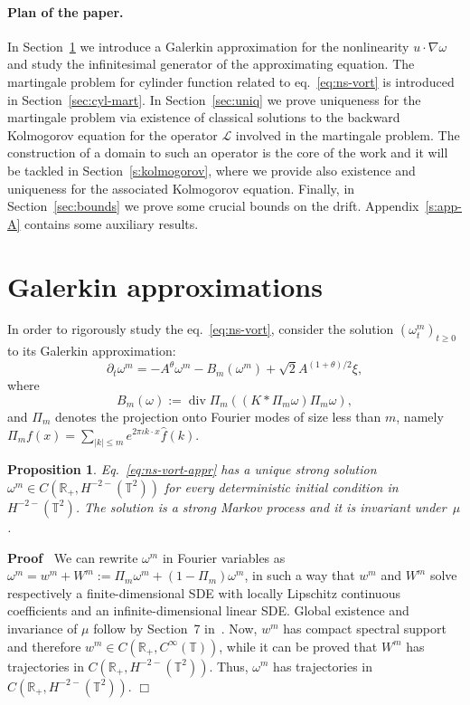 \documentclass{article}
\newcommand{\assign}{:=}
\newcommand{\tmop}[1]{\ensuremath{\operatorname{#1}}}
\newenvironment{proof}{\noindent\textbf{Proof\ }}{\hspace*{\fill}$\Box$\medskip}
\newtheorem{proposition}{Proposition}
{\theorembodyfont{\rmfamily}\newtheorem{remark}{Remark}}
\begin{document}
\paragraph*{Plan of the paper.}In Section~\ref{s:galerkin} we introduce a
Galerkin approximation for the nonlinearity $u \cdot \nabla \omega$ and study
the infinitesimal generator of the approximating equation. The martingale
problem for cylinder function related to eq.~{\eqref{eq:ns-vort}} is
introduced in Section~\ref{sec:cyl-mart}. In Section~\ref{sec:uniq} we prove
uniqueness for the martingale problem via existence of classical solutions to
the backward Kolmogorov equation for the operator $\mathcal{L}$ involved in
the martingale problem. The construction of a domain to such an operator is
the core of the work and it will be tackled in Section~\ref{s:kolmogorov},
where we provide also existence and uniqueness for the associated Kolmogorov
equation. Finally, in Section~\ref{sec:bounds} we prove some crucial bounds on
the drift. Appendix~\ref{s:app-A} contains some auxiliary results.

\section{Galerkin approximations}\label{s:galerkin}

In order to rigorously study the eq.~{\eqref{eq:ns-vort}}, consider the
solution $(\omega^m_t)_{t \geqslant 0}$ to its Galerkin approximation:
\begin{equation}
  \partial_t \omega^m = - A^{\theta} \omega^m - B_m (\omega^m) + \sqrt{2}
  A^{(1 + \theta) / 2} \xi, \label{eq:ns-vort-appr}
\end{equation}
where
\[ B_m (\omega) \assign \tmop{div} \Pi_m ((K \ast \Pi_m \omega) \Pi_m \omega),
\]
and $\Pi_m$ denotes the projection onto Fourier modes of size less than $m$,
namely $\Pi_m f (x) = \sum_{| k | \leqslant m} e^{2 \pi \iota k \cdot x}
\hat{f} (k)$.

\begin{proposition}
  Eq.~{\eqref{eq:ns-vort-appr}} has a unique strong solution $\omega^m \in C
  (\mathbb{R}_+, H^{- 2 -} (\mathbb{T}^2))$ for every deterministic initial
  condition in $H^{- 2 -} (\mathbb{T}^2)$. The solution is a strong Markov
  process and it is invariant under~$\mu$.
\end{proposition}

\begin{proof}
  We can rewrite $\omega^m$ in Fourier variables as $\omega^m = w^m + W^m
  \assign \Pi_m \omega^m + (1 - \Pi_m) \omega^m$, in such a way that $w^m$ and
  $W^m$ solve respectively a finite-dimensional SDE with locally Lipschitz
  continuous coefficients and an infinite-dimensional linear SDE. Global
  existence and invariance of $\mu$ follow by Section~7
  in~{\cite{gubinelli2013regularization}}. Now, $w^m$ has compact spectral
  support and therefore $w^m \in C (\mathbb{R}_+, C^{\infty} (\mathbb{T}))$,
  while it can be proved that $W^m$ has trajectories in $C (\mathbb{R}_+, H^{-
  2 -} (\mathbb{T}^2))$. Thus, $\omega^m$ has trajectories in $C
  (\mathbb{R}_+, H^{- 2 -} (\mathbb{T}^2))$.
\end{proof}
\end{document}
